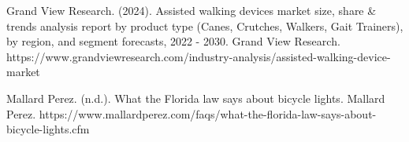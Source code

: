 \begin{thebibliography}{45}
	 Grand View Research. (2024). Assisted walking devices market size, share \& trends analysis report by product type (Canes, Crutches, Walkers, Gait Trainers), by region, and segment forecasts, 2022 - 2030. Grand View Research. https://www.grandviewresearch.com/industry-analysis/assisted-walking-device-market
	
	 Mallard Perez. (n.d.). What the Florida law says about bicycle lights. Mallard Perez. https://www.mallardperez.com/faqs/what-the-florida-law-says-about-bicycle-lights.cfm 
	
\end{thebibliography}